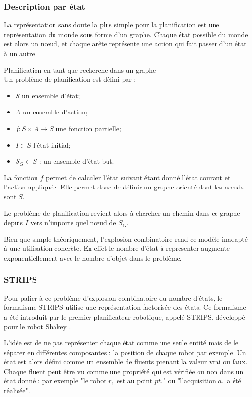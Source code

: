 \subsubsection{Description par état}

La représentation sans doute la plus simple pour la planification est une représentation du monde sous forme d'un graphe. Chaque état possible du monde est alors un nœud, et chaque arête représente une action qui fait passer d'un état à un autre.

\begin{definition}Planification en tant que recherche dans un graphe\\
	\label{def:plannif_etat}Un problème de planification est défini par :
	\begin{itemize}
		\item $S$ un ensemble d'état;
		\item $A$ un ensemble d'action;
		\item $f : S \times A \to S$ une fonction partielle;
		\item $I \in S$ l'état initial;
		\item $S_G \subset S$ : un ensemble d'état but.
	\end{itemize}
\end{definition}

La fonction $f$ permet de calculer l'état suivant étant donné l'état courant et l'action appliquée.
Elle permet donc de définir un graphe orienté dont les nœuds sont $S$.

Le problème de planification revient alors à chercher un chemin dans ce graphe depuis $I$ vers n'importe quel nœud de $S_G$.

Bien que simple théoriquement, l'explosion combinatoire rend ce modèle inadapté à une utilisation concrète. En effet le nombre d'état à représenter augmente exponentiellement avec le nombre d'objet dans le problème.

\subsubsection{STRIPS}

Pour palier à ce problème d'explosion combinatoire du nombre d'états, le formalisme STRIPS \cite{STRIPS} utilise une représentation factorisée des états. Ce formalisme a été introduit par le premier planificateur robotique, appelé STRIPS, développé pour le robot Shakey \cite{Shakey}.

L'idée est de ne pas représenter chaque état comme une seule entité mais de le séparer en différentes composantes : la position de chaque robot par exemple. Un état est alors défini comme un ensemble de fluents prenant la valeur vrai ou faux. Chaque fluent peut être vu comme une propriété qui est vérifiée ou non dans un état donné : par exemple "le robot $r_1$ est au point $pt_1$" ou "l'acquisition $a_1$ a été réalisée".

